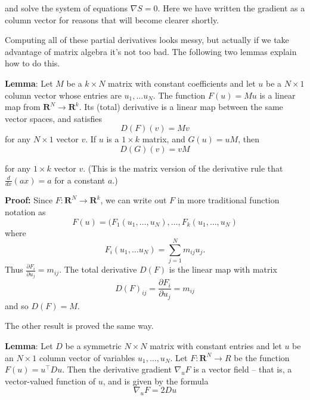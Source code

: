 \documentclass[
]{article}
\begin{document}
and solve the system of equations \(\nabla S=0\). Here we have written
the gradient as a column vector for reasons that will become clearer
shortly.

Computing all of these partial derivatives looks messy, but actually if
we take advantage of matrix algebra it's not too bad. The following two
lemmas explain how to do this.

\textbf{Lemma}: Let \(M\) be a \(k\times N\) matrix with constant
coefficients and let \(u\) be a \(N\times 1\) column vector whose
entries are \(u_1,\ldots u_{N}\). The function \(F(u) = Mu\) is a linear
map from \(\mathbf{R}^{N}\to\mathbf{R}^{k}\). Its (total) derivative is
a linear map between the same vector spaces, and satisfies \[
D(F)(v) = Mv
\] for any \(N\times 1\) vector \(v\). If \(u\) is a \(1\times k\)
matrix, and \(G(u) = uM\), then \[
D(G)(v) = vM
\]

for any \(1\times k\) vector \(v\). (This is the matrix version of the
derivative rule that \(\frac{d}{dx}(ax)=a\) for a constant \(a\).)

\textbf{Proof:} Since \(F:\mathbf{R}^{N}\to\mathbf{R}^{k}\), we can
write out \(F\) in more traditional function notation as \[
F(u) = (F_{1}(u_1,\ldots, u_N), \ldots, F_{k}(u_1,\ldots, u_{N})
\] where \[
F_{i}(u_1,\ldots u_N) = \sum_{j=1}^{N} m_{ij}u_{j}.
\] Thus \(\frac{\partial F_{i}}{\partial u_{j}} = m_{ij}\). The total
derivative \(D(F)\) is the linear map with matrix \[
D(F)_{ij} = \frac{\partial F_{i}}{\partial u_{j}} = m_{ij}
\] and so \(D(F)=M\).

The other result is proved the same way.

\textbf{Lemma}: Let \(D\) be a symmetric \(N\times N\) matrix with
constant entries and let \(u\) be an \(N\times 1\) column vector of
variables \(u_{1},\ldots, u_{N}\). Let \(F:\mathbf{R}^{N}\to R\) be the
function \(F(u) = u^{\intercal}Du\). Then the derivative gradient
\(\nabla_{u} F\) is a vector field -- that is, a vector-valued function
of \(u\), and is given by the formula \[
\nabla_{u} F = 2Du
\]
\end{document}

